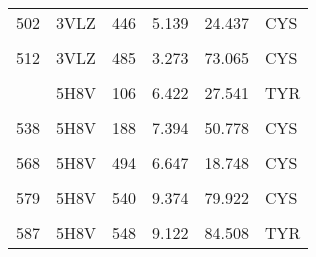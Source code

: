 \begin{table}
\begin{tabular}{llrrrl}
			502 & 3VLZ & 446 & 5.139 & 24.437 & CYS\\
			\cellcolor{gray!6}{508} & \cellcolor{gray!6}{3VLZ} & \cellcolor{gray!6}{481} & \cellcolor{gray!6}{9.234} & \cellcolor{gray!6}{60.738} & \cellcolor{gray!6}{CYS}\\
			512 & 3VLZ & 485 & 3.273 & 73.065 & CYS\\
			\cellcolor{gray!6}{518} & \cellcolor{gray!6}{3VLZ} & \cellcolor{gray!6}{97} & \cellcolor{gray!6}{7.804} & \cellcolor{gray!6}{45.105} & \cellcolor{gray!6}{HIS}\\
			\addlinespace
			521 & 5H8V & 106 & 6.422 & 27.541 & TYR\\
			\cellcolor{gray!6}{536} & \cellcolor{gray!6}{5H8V} & \cellcolor{gray!6}{163} & \cellcolor{gray!6}{3.306} & \cellcolor{gray!6}{41.041} & \cellcolor{gray!6}{HIS}\\
			538 & 5H8V & 188 & 7.394 & 50.778 & CYS\\
			\cellcolor{gray!6}{561} & \cellcolor{gray!6}{5H8V} & \cellcolor{gray!6}{371} & \cellcolor{gray!6}{6.965} & \cellcolor{gray!6}{45.190} & \cellcolor{gray!6}{TYR}\\
			568 & 5H8V & 494 & 6.647 & 18.748 & CYS\\
			\addlinespace
			\cellcolor{gray!6}{574} & \cellcolor{gray!6}{5H8V} & \cellcolor{gray!6}{500} & \cellcolor{gray!6}{6.699} & \cellcolor{gray!6}{36.673} & \cellcolor{gray!6}{CYS}\\
			579 & 5H8V & 540 & 9.374 & 79.922 & CYS\\
			\cellcolor{gray!6}{583} & \cellcolor{gray!6}{5H8V} & \cellcolor{gray!6}{544} & \cellcolor{gray!6}{3.261} & \cellcolor{gray!6}{85.621} & \cellcolor{gray!6}{CYS}\\
			587 & 5H8V & 548 & 9.122 & 84.508 & TYR\\
			\bottomrule
		\end{tabular}
	\end{table}

